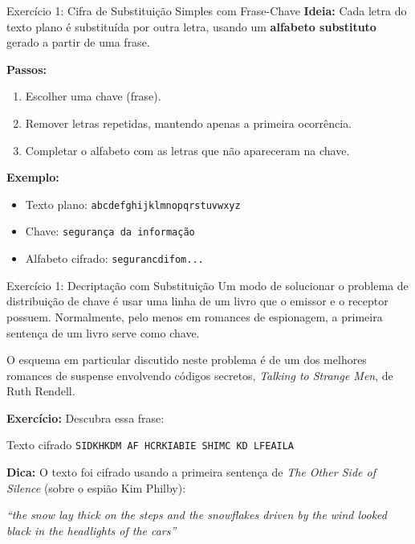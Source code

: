 
\begin{frame}{Exercício 1: Cifra de Substituição Simples com Frase-Chave}
\textbf{Ideia:}  
Cada letra do texto plano é substituída por outra letra, usando um \textbf{alfabeto substituto} gerado a partir de uma frase.

\medskip
\textbf{Passos:}
\begin{enumerate}
    \item Escolher uma chave (frase).  
    \item Remover letras repetidas, mantendo apenas a primeira ocorrência.  
    \item Completar o alfabeto com as letras que não apareceram na chave.  
\end{enumerate}

\medskip
\textbf{Exemplo:}  
\begin{itemize}
    \item Texto plano: \texttt{abcdefghijklmnopqrstuvwxyz}  
    \item Chave: \texttt{segurança da informação}  
    \item Alfabeto cifrado: \texttt{segurancdifom...}  
\end{itemize}
\end{frame}

\begin{frame}{Exercício 1:  Decriptação com Substituição}
Um modo de solucionar o problema de distribuição de chave é usar uma linha de um livro que o emissor e o receptor possuem. Normalmente, pelo menos em romances de espionagem, a primeira sentença de um livro serve como chave. 

\medskip
O esquema em particular discutido neste problema é de um dos melhores romances de suspense envolvendo códigos secretos, \textit{Talking to Strange Men}, de Ruth Rendell. 

\medskip
\textbf{Exercício:}  
Descubra essa frase:

\begin{block}{Texto cifrado}
\centering
\texttt{SIDKHKDM AF HCRKIABIE SHIMC KD LFEAILA}
\end{block}

\textbf{Dica:} O texto foi cifrado usando a primeira sentença de \textit{The Other Side of Silence} (sobre o espião Kim Philby):

\smallskip
\emph{``the snow lay thick on the steps and the snowflakes driven by the wind looked black in the headlights of the cars''}
\end{frame}


